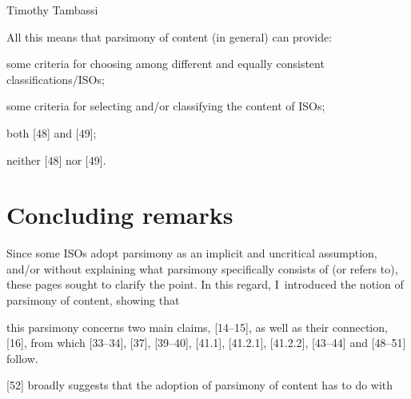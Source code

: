 \begin{artengenv}{Timothy Tambassi}
\begin{enumerate}[label={[\arabic*]}]
\end{enumerate}

All this means that parsimony of content (in general) can provide:



\setcounter{saveenumtambassi}{\value{enumi}}

\begin{enumerate}[label={[\arabic*]}]

\setcounter{enumi}{\value{saveenumtambassi}}

\item some criteria for choosing among different and equally consistent classifications/ISOs;

\item some criteria for selecting and/or classifying the content of ISOs;

\item both [48] and [49];

\item neither [48] nor [49].

\end{enumerate}

\section{Concluding remarks }

Since some ISOs adopt parsimony as an implicit and uncritical assumption, and/or without explaining what parsimony specifically consists of (or refers to), these pages sought to clarify the point. In this regard, I~introduced the notion of parsimony of content, showing that



\setcounter{saveenumtambassi}{\value{enumi}}

\begin{enumerate}[label={[\arabic*]}]

\setcounter{enumi}{\value{saveenumtambassi}}

\item this parsimony concerns two main claims, [14–15], as well as their connection, [16], from which [33–34], [37], [39–40], [41.1], [41.2.1], [41.2.2], [43–44] and [48–51] follow.

\end{enumerate}

[52] broadly suggests that the adoption of parsimony of content has to do with



\setcounter{saveenumtambassi}{\value{enumi}}


\end{artengenv}
